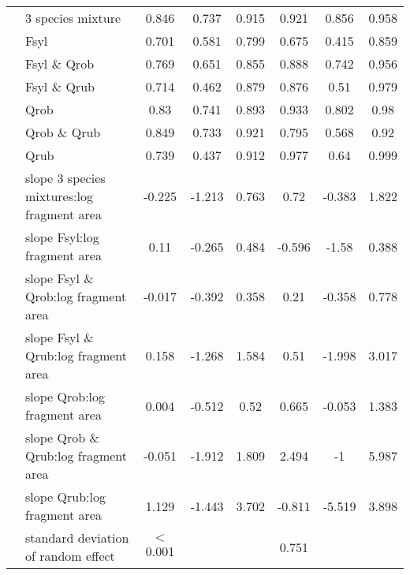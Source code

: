 \documentclass[10pt, twoside]{book} %
\begin{document}
\begin{landscape}
\begin{table}
\begin{center}
\begin{footnotesize}
\begin{tabular}{c l c c c c c c}
					& 3 species mixture & 0.846 & 0.737 & 0.915 & 	0.921 & 0.856 & 0.958\\
					& Fsyl & 0.701 & 0.581 & 0.799 & 	0.675 & 0.415 & 0.859\\
					& Fsyl \& Qrob & 0.769 & 0.651 & 0.855 & 	0.888 & 0.742 & 0.956\\
					& Fsyl \& Qrub &0.714 & 0.462 & 0.879 & 	0.876 & 0.51 & 0.979\\
					& Qrob &0.83 & 0.741 & 0.893 & 	0.933 & 0.802 & 0.98\\
					& Qrob \& Qrub & 0.849 & 0.733 & 0.921 & 	0.795 & 0.568 & 0.92\\
					& Qrub & 0.739 & 0.437 & 0.912 &  	0.977 & 0.64 & 0.999\\
					\cline{2-8}
					\multirow{7}{*}{\rotatebox[origin=c]{90}{\parbox[c]{3cm}{\centering Slopes)}}} & slope 3 species mixtures:log fragment area & -0.225 & -1.213 & 0.763 & 	0.72 & -0.383 & 1.822\\
					& slope Fsyl:log fragment area & 0.11 & -0.265 & 0.484 & 	-0.596 & -1.58 & 0.388\\
					& slope Fsyl \& Qrob:log fragment area &-0.017 & -0.392 & 0.358 & 	0.21 & -0.358 & 0.778\\
					& slope Fsyl \& Qrub:log fragment area & 0.158 & -1.268 & 1.584 & 	0.51 & -1.998 & 3.017\\
					& slope Qrob:log fragment area & 0.004 & -0.512 & 0.52 & 	0.665 & -0.053 & 1.383\\
					& slope Qrob \& Qrub:log fragment area & -0.051 & -1.912 & 1.809 & 	2.494 & -1 & 5.987\\
					& slope Qrub:log fragment area & 1.129 & -1.443 & 3.702 &  	-0.811 & -5.519 & 3.898\\
					\cline{2-8}
					
					& standard deviation of random effect& $< $0.001&&& 0.751&&\\	
					\bottomrule
				\end{tabular}\endgroup
			\end{footnotesize}
		\end{center}
	\end{table}
\end{landscape}
\clearpage
\end{document}
